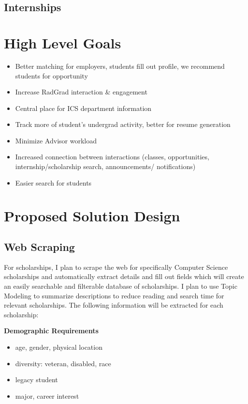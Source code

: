 \documentclass[english]{proposalnsf}
\begin{document}
	
	\subsection{Internships}
	

	
	\section{High Level Goals}
	\label{Goals}
	\begin{itemize}
		\item  Better matching for employers, students fill out profile, we recommend students for opportunity
		\item Increase RadGrad interaction \& engagement
		\item Central place for ICS department information
		\item Track more of student's undergrad activity, better for resume generation
		\item Minimize Advisor workload
		\item  Increased connection between interactions (classes, opportunities, internship/scholarship search, announcements/ notifications)
		\item Easier search for students
	\end{itemize}
	
	
	
	
	\section{Proposed Solution Design}
	\label{solution-design}
	
		\subsection{Web Scraping}
		For scholarships, I plan to scrape the web for specifically Computer Science scholarships and automatically extract details and fill out fields which will create an easily searchable and filterable database of scholarships. I plan to use Topic Modeling to summarize descriptions to reduce reading and search time for relevant scholarships. The following information will be extracted for each scholarship:
		
		\textbf{Demographic Requirements}
		\begin{itemize}
			\item age, gender, physical location
			\item diversity: veteran, disabled, race
			\item legacy student
			\item major, career interest
		\end{itemize}
	
\end{document}
